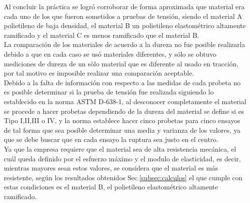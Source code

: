 \documentclass[a4paper, 11pt]{article}
\begin{document}
Al concluir la práctica se logró corroborar de forma aproximada que material era cada uno de los que fueron sometidos a pruebas de tensión, siendo el material A polietileno de baja densidad, el material B un polietileno elastométrico altamente ramificado y el material C es menos ramificado que el material B.\\
La comparación de los materiales de acuerdo a la dureza no fue posible realizarla debido a que en cada caso se usó materiales diferentes, y sólo se obtuvo mediciones de dureza de un sòlo material que es diferente al usado en tracción, por tal motivo es imposible realizar una comparación aceptable.\\
Debido a la falta de información con respecto a las medidas de cada probeta no es posible determinar si la prueba de tensión fue realizada siguiendo lo establecido en la norma ASTM D-638-1, al desconocer completamente el material se procede a hacer probetas dependiendo de la dureza del material se define si es Tipo I,II,III o IV, y la norma establece hacer cinco probetas para cinco ensayos de tal forma que sea posible determinar una media y varianza de los valores, ya que se debe buscar que en cada ensayo la ruptura sea justo en el centro.\\
Ya que la empresa requiere que el material sea de alta resistencia mecánica, el cuál queda definido por el esfuerzo máximo y el modulo de elasticidad, es decir, mientras mayores sean estos valores, se considera que el material es más resistente, según los resultados obtenidos Sec.\ref{subsec:calculos} el que cumple con estas condiciones es el material B, el polietileno elastométrico altamente ramificado.  
\end{document}
